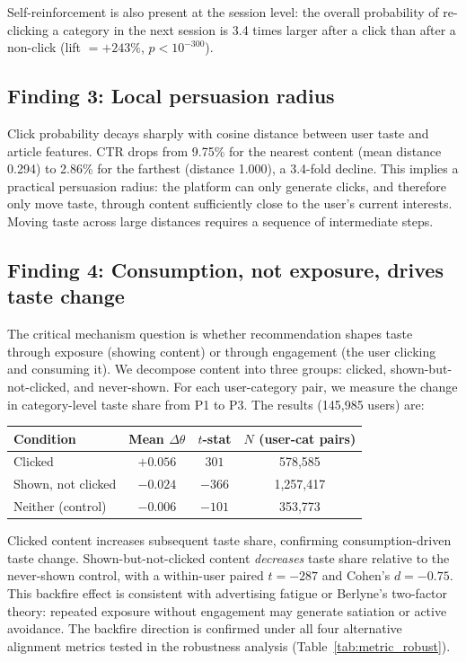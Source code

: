 \documentclass[11pt]{article}
\begin{document}
Self-reinforcement is also present at the session level: the overall probability of re-clicking a category in the next session is 3.4 times larger after a click than after a non-click (lift $= +243\%$, $p < 10^{-300}$).

\subsection{Finding 3: Local persuasion radius}

Click probability decays sharply with cosine distance between user taste and article features. CTR drops from 9.75\% for the nearest content (mean distance 0.294) to 2.86\% for the farthest (distance 1.000), a 3.4-fold decline. This implies a practical persuasion radius: the platform can only generate clicks, and therefore only move taste, through content sufficiently close to the user's current interests. Moving taste across large distances requires a sequence of intermediate steps.

\subsection{Finding 4: Consumption, not exposure, drives taste change}

The critical mechanism question is whether recommendation shapes taste through exposure (showing content) or through engagement (the user clicking and consuming it). We decompose content into three groups: clicked, shown-but-not-clicked, and never-shown. For each user-category pair, we measure the change in category-level taste share from P1 to P3. The results (145,985 users) are:

\begin{center}
\begin{tabular}{lccc}
\toprule
Condition & Mean $\Delta\theta$ & $t$-stat & $N$ (user-cat pairs) \\
\midrule
Clicked & $+0.056$ & $301$ & 578,585 \\
Shown, not clicked & $-0.024$ & $-366$ & 1,257,417 \\
Neither (control) & $-0.006$ & $-101$ & 353,773 \\
\bottomrule
\end{tabular}
\end{center}

Clicked content increases subsequent taste share, confirming consumption-driven taste change. Shown-but-not-clicked content \emph{decreases} taste share relative to the never-shown control, with a within-user paired $t = -287$ and Cohen's $d = -0.75$. This backfire effect is consistent with advertising fatigue or Berlyne's two-factor theory: repeated exposure without engagement may generate satiation or active avoidance. The backfire direction is confirmed under all four alternative alignment metrics tested in the robustness analysis (Table~\ref{tab:metric_robust}).
\end{document}
